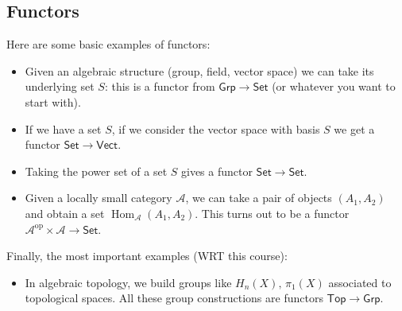 \subsection{Functors}
\begin{example}\label{funk} 
   Here are some basic examples of functors:
   \begin{itemize}
       \item Given an algebraic structure (group, field, vector space) we can take its underlying set $S$: this is a functor from $\mathsf{Grp}\to \mathsf{Set}$ (or whatever you want to start with).
       \item If we have a set $S$, if we consider the vector space with basis $S$ we get a functor $\mathsf{Set} \to \mathsf{Vect}$.
       \item Taking the power set of a set $S$ gives a functor $\mathsf{Set}\to \mathsf{Set}$.
       \item Given a locally small category $\mathcal{A}$, we can take a pair of objects $(A_1,A_2)$ and obtain a set $\operatorname{Hom}_{\mathcal{A}}(A_1,A_2)$. This turns out to be a functor $\mathcal{A}^{\text{op}}\times \mathcal{A}\to \mathsf{Set}$.
   \end{itemize}
   Finally, the most important examples (WRT this course):
   \begin{itemize}
       \item In algebraic topology, we build groups like $H_n(X),\, \pi_1(X)$ associated to topological spaces. All these group constructions are functors $\mathsf{Top} \to \mathsf{Grp}$.
   \end{itemize}
\end{example}
